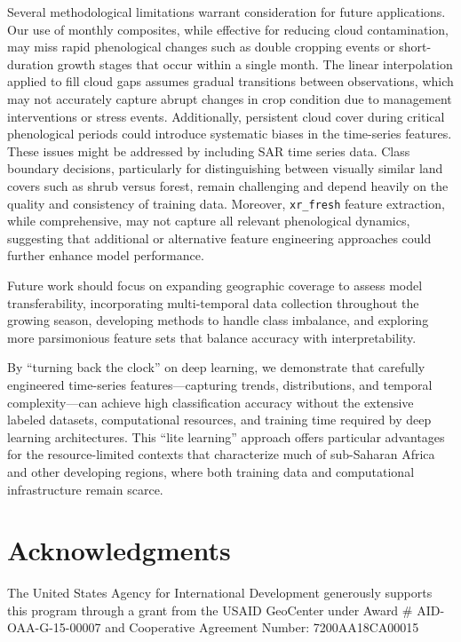 \documentclass[
  journal,
  twocolumn]{IEEEtran}
\begin{document}
Several methodological limitations warrant consideration for future
applications. Our use of monthly composites, while effective for
reducing cloud contamination, may miss rapid phenological changes such
as double cropping events or short-duration growth stages that occur
within a single month. The linear interpolation applied to fill cloud
gaps assumes gradual transitions between observations, which may not
accurately capture abrupt changes in crop condition due to management
interventions or stress events. Additionally, persistent cloud cover
during critical phenological periods could introduce systematic biases
in the time-series features. These issues might be addressed by
including SAR time series data. Class boundary decisions, particularly
for distinguishing between visually similar land covers such as shrub
versus forest, remain challenging and depend heavily on the quality and
consistency of training data. Moreover, \texttt{xr\_fresh} feature
extraction, while comprehensive, may not capture all relevant
phenological dynamics, suggesting that additional or alternative feature
engineering approaches could further enhance model performance.

Future work should focus on expanding geographic coverage to assess
model transferability, incorporating multi-temporal data collection
throughout the growing season, developing methods to handle class
imbalance, and exploring more parsimonious feature sets that balance
accuracy with interpretability.

By ``turning back the clock'' on deep learning, we demonstrate that
carefully engineered time-series features---capturing trends,
distributions, and temporal complexity---can achieve high classification
accuracy without the extensive labeled datasets, computational
resources, and training time required by deep learning architectures.
This ``lite learning'' approach offers particular advantages for the
resource-limited contexts that characterize much of sub-Saharan Africa
and other developing regions, where both training data and computational
infrastructure remain scarce.

\newpage

\hypertarget{acknowledgments}{%
\section{Acknowledgments}\label{acknowledgments}}

The United States Agency for International Development generously
supports this program through a grant from the USAID GeoCenter under
Award \# AID-OAA-G-15-00007 and Cooperative Agreement Number:
7200AA18CA00015
\end{document}
